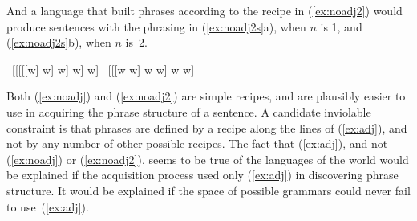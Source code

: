 And a language that built phrases according to the recipe in (\ref{ex:noadj2}) would produce sentences with the phrasing in (\ref{ex:noadj2s}a), when $n$ is 1, and (\ref{ex:noadj2s}b), when $n$ is~2.
\begin{exe}
	\raggedright
	\ex \label{ex:noadj2s} 
	\begin{xlist}
		\ex \ [[[[[w] w] w] w] w]
		\ex \ [[[w w] w w] w w]
	\end{xlist}
\end{exe}
Both (\ref{ex:noadj}) and (\ref{ex:noadj2}) are simple recipes, and are plausibly easier to use in acquiring the phrase structure of a sentence. A candidate inviolable constraint is that phrases are defined by a recipe along the lines of (\ref{ex:adj}), and not by any number of other possible recipes. The fact that (\ref{ex:adj}), and not (\ref{ex:noadj}) or (\ref{ex:noadj2}), seems to be true of the languages of the world would be explained if the acquisition process used only (\ref{ex:adj}) in discovering phrase structure. It would be explained if the space of possible grammars could never fail to use~(\ref{ex:adj}).

